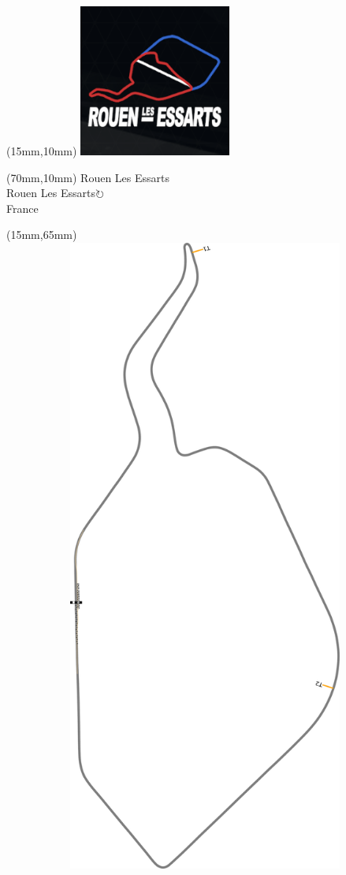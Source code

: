 \null\newpage
\begin{textblock*}{50mm}(15mm,10mm)%
\includegraphics[width=50mm]{LG/ROUE.png}
\end{textblock*}
\begin{textblock*}{130mm}(70mm,10mm)%
{\fontsize{20}{20}\selectfont Rouen Les Essarts\\}
{\fontsize{16}{16}\selectfont Rouen Les Essarts\hfill \Large$\circlearrowright$\\}
{\fontsize{12}{12}\selectfont France\\}
\end{textblock*}
\begin{textblock*}{185mm}(15mm,65mm)%
\centering
\mbox{\includegraphics[width=185mm,height=210mm,keepaspectratio]{PT/ROUE.pdf}}
\end{textblock*}
